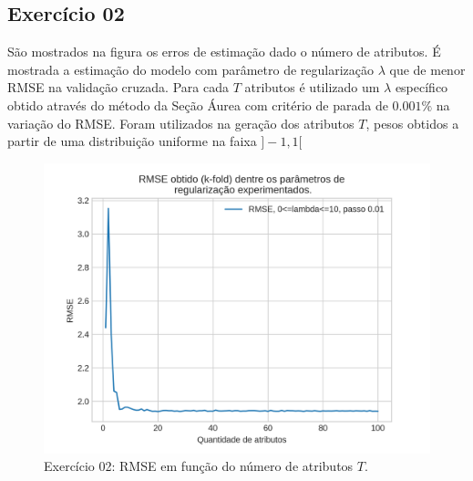 \documentclass{article}
\begin{document}
    \newpage
    \subsection[]{Exercício 02}
    São mostrados na figura  os erros de estimação dado o número de atributos.
    É mostrada a estimação do modelo com parâmetro de regularização $\lambda$ que de menor RMSE na validação cruzada.
    Para cada $T$ atributos é utilizado um $\lambda$ específico obtido através do
    método da Seção Áurea com critério de parada de $0.001\%$ na variação do RMSE.
    Foram utilizados na geração dos atributos $T$,
    pesos obtidos a partir de uma distribuição uniforme na faixa $]-1,1[$
    \begin{figure}[!ht]
        \centering
        \includegraphics[width=\linewidth]{ex02/TsMeans.png}
        \caption{Exercício 02: RMSE em função do número de atributos $T$.}
        \label{fig:ex2_TRMSE}
    \end{figure}
    
\end{document}
